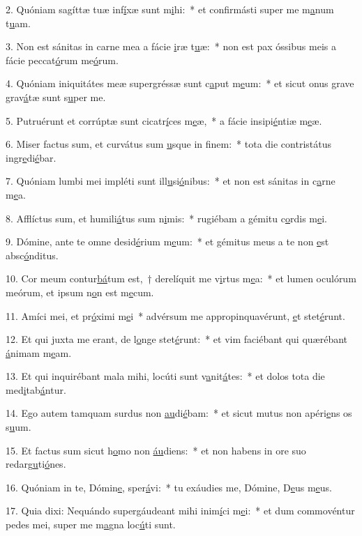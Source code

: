 2. Quóniam sagíttæ tuæ inf\uline{í}xæ sunt m\uline{i}hi:~* et confirmásti super me m\uline{a}num t\uline{u}am.\par 
3. Non est sánitas in carne mea a fácie \uline{i}ræ t\uline{u}æ:~* non est pax óssibus meis a fácie peccat\uline{ó}rum me\uline{ó}rum.\par 
4. Quóniam iniquitátes meæ supergréssæ sunt c\uline{a}put m\uline{e}um:~* et sicut onus grave grav\uline{á}tæ sunt s\uline{u}per me.\par 
5. Putruérunt et corrúptæ sunt cicatr\uline{í}ces m\uline{e}æ,~* a fácie insipi\uline{é}ntiæ m\uline{e}æ.\par 
6. Miser factus sum, et curvátus sum \uline{u}sque in f\uline{i}nem:~* tota die contristátus ingr\uline{e}di\uline{é}bar.\par 
7. Quóniam lumbi mei impléti sunt ill\uline{u}si\uline{ó}nibus:~* et non est sánitas in c\uline{a}rne m\uline{e}a.\par 
8. Afflíctus sum, et humili\uline{á}tus sum n\uline{i}mis:~* rugiébam a gémitu c\uline{o}rdis m\uline{e}i.\par 
9. Dómine, ante te omne desid\uline{é}rium m\uline{e}um:~* et gémitus meus a te non \uline{e}st absc\uline{ó}nditus.\par 
10. Cor meum contur\uline{bá}tum est,~† derelíquit me v\uline{i}rtus m\uline{e}a:~* et lumen oculórum meórum, et ipsum n\uline{o}n est m\uline{e}cum.\par 
11. Amíci mei, et pr\uline{ó}ximi m\uline{e}i~* advérsum me appropinquavérunt, \uline{e}t stet\uline{é}runt.\par 
12. Et qui juxta me erant, de l\uline{o}nge stet\uline{é}runt:~* et vim faciébant qui quærébant \uline{á}nimam m\uline{e}am.\par 
13. Et qui inquirébant mala mihi, locúti sunt v\uline{a}nit\uline{á}tes:~* et dolos tota die med\uline{i}tab\uline{á}ntur.\par 
14. Ego autem tamquam surdus non \uline{au}di\uline{é}bam:~* et sicut mutus non apéri\uline{e}ns os s\uline{u}um.\par 
15. Et factus sum sicut h\uline{o}mo non \uline{áu}diens:~* et non habens in ore suo redarg\uline{u}ti\uline{ó}nes.\par 
16. Quóniam in te, Dómin\uline{e}, sper\uline{á}vi:~* tu exáudies me, Dómine, D\uline{e}us m\uline{e}us.\par 
17. Quia dixi: Nequándo supergáudeant mihi inim\uline{í}ci m\uline{e}i:~* et dum commovéntur pedes mei, super me m\uline{a}gna loc\uline{ú}ti sunt.\par 
